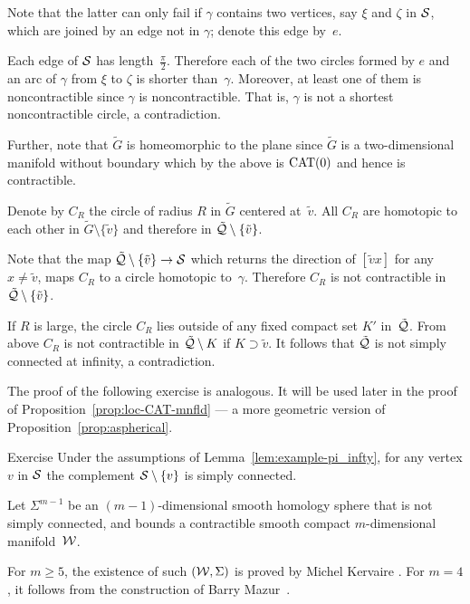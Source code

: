 Note that the latter can only fail if $\gamma$ contains two vertices, say $\xi$ 
and 
$\zeta$ in $\mathcal{S}$,
which are joined by an edge not in $\gamma$; 
denote this edge by~$e$.

Each edge of $\mathcal{S}$ has length~$\tfrac\pi2$.
Therefore each of the two circles formed by $e$ and an arc of $\gamma$
from $\xi$ to $\zeta$ is shorter than~$\gamma$.
Moreover,
at least one of them is noncontractible 
since $\gamma$ is 
noncontractible.
That is, 
$\gamma$ is not a shortest noncontractible circle, a contradiction.
\claimqeds

Further, note that 
$\tilde G$ is homeomorphic to the plane
since $\tilde G$ is 
a two-dimensional manifold without boundary which 
by the above is $\mathrm{CAT}(0)$ and hence is contractible.

Denote by $C_R$ the circle of radius $R$ in $\tilde G$ centered at~$\tilde v$.
All $C_R$ are homotopic to each other in $\tilde G\setminus\{\tilde v\}$ and therefore in $\tilde{\mathcal{Q}}\setminus \{\tilde v\}$.

Note that the map $\tilde{\mathcal{Q}}\setminus \{\tilde v\}\to \mathcal{S}$
which returns the direction of $[{\tilde v}{x}]$  for any $x\ne \tilde v$, maps $C_R$ to a circle homotopic to~$\gamma$.
Therefore $C_R$ is not contractible in $\tilde{\mathcal{Q}}\setminus \{\tilde v\}$.

If $R$ is large, 
the circle $C_R$  
lies outside of any fixed compact set $K'$ in~$\tilde{\mathcal{Q}}$.
From above $C_R$ is not contractible in $\tilde{\mathcal{Q}}\setminus K$
if $K\supset \tilde v$.
It follows that $\tilde{\mathcal{Q}}$ is not simply connected at infinity, a contradiction.
\qeds

The proof of the following exercise is analogous.
It will be used later in the proof of Proposition~\ref{prop:loc-CAT-mnfld} --- a more geometric version of Proposition~\ref{prop:aspherical}.

\begin{thm}{Exercise}\label{ex:example-pi_infty-new}
Under the assumptions of Lemma~\ref{lem:example-pi_infty}, 
for any vertex $v$ in $\mathcal{S}$
the complement $\mathcal{S}\setminus\{v\}$ is simply connected.
\end{thm}

Let $\Sigma^{m-1}$ be an $(m-1)$-dimensional smooth homology sphere that  is not simply connected, and bounds a contractible smooth compact $m$-dimensional manifold~$\mathcal{W}$. 

For $m\ge 5$, the existence of such $(\mathcal{W}, \Sigma)$
is proved by Michel Kervaire \cite{kervaire}. 
For $m=4$, it follows from the construction of Barry Mazur~\cite{mazur}.

